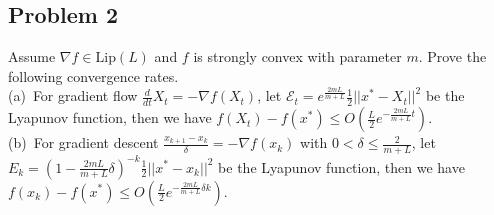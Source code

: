 \documentclass[11pt]{article}
\begin{document}
\subsection*{Problem 2}
Assume $\nabla f\in\text{Lip}(L)$ and $f$ is strongly convex with parameter $m$. Prove the following convergence rates. \\
\noindent (a)\ For gradient flow $\frac{d}{dt}X_t=-\nabla f(X_t)$, let $\mathcal{E}_t=e^{\frac{2mL}{m+L}}\frac{1}{2}||x^*-X_t||^2$ be the Lyapunov function, then we have $f(X_t)-f(x^*)\leq O(\frac{L}{2}e^{-\frac{2mL}{m+L}t})$. \\
\noindent (b)\ For gradient descent $\frac{x_{k+1}-x_k}{\delta}=-\nabla f(x_k)$ with $0<\delta\leq\frac{2}{m+L}$, let $E_k=\left(1-\frac{2mL}{m+L}\delta\right)^{-k}\frac{1}{2}||x^*-x_k||^2$ be the Lyapunov function, then we have $f(x_k)-f(x^*)\leq O(\frac{L}{2}e^{-\frac{2mL}{m+L}\delta k})$.
\end{document}
